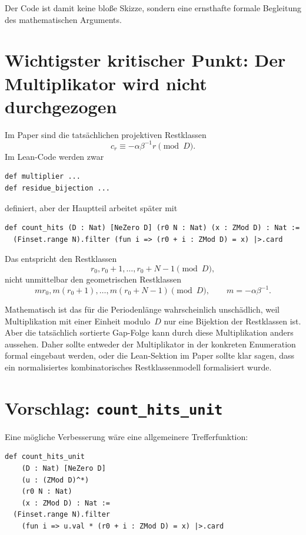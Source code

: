 \documentclass[11pt]{article}
\begin{document}
Der Code ist damit keine bloße Skizze, sondern eine ernsthafte formale Begleitung des mathematischen Arguments.

\section{Wichtigster kritischer Punkt: Der Multiplikator wird nicht durchgezogen}

Im Paper sind die tatsächlichen projektiven Restklassen
\[
    c_r \equiv -\alpha\beta^{-1}r \pmod D.
\]
Im Lean-Code werden zwar

\begin{lstlisting}
def multiplier ...
def residue_bijection ...
\end{lstlisting}

definiert, aber der Hauptteil arbeitet später mit

\begin{lstlisting}
def count_hits (D : Nat) [NeZero D] (r0 N : Nat) (x : ZMod D) : Nat :=
  (Finset.range N).filter (fun i => (r0 + i : ZMod D) = x) |>.card
\end{lstlisting}

Das entspricht den Restklassen
\[
    r_0, r_0+1, \ldots, r_0+N-1 \pmod D,
\]
nicht unmittelbar den geometrischen Restklassen
\[
    m r_0, m(r_0+1), \ldots, m(r_0+N-1) \pmod D,
    \qquad m=-\alpha\beta^{-1}.
\]

Mathematisch ist das für die Periodenlänge wahrscheinlich unschädlich, weil Multiplikation mit einer Einheit modulo~\(D\) nur eine Bijektion der Restklassen ist. Aber die tatsächlich sortierte Gap-Folge kann durch diese Multiplikation anders aussehen. Daher sollte entweder der Multiplikator in der konkreten Enumeration formal eingebaut werden, oder die Lean-Sektion im Paper sollte klar sagen, dass ein normalisiertes kombinatorisches Restklassenmodell formalisiert wurde.

\section{Vorschlag: \texttt{count\_hits\_unit}}

Eine mögliche Verbesserung wäre eine allgemeinere Trefferfunktion:

\begin{lstlisting}
def count_hits_unit
    (D : Nat) [NeZero D]
    (u : (ZMod D)^*)
    (r0 N : Nat)
    (x : ZMod D) : Nat :=
  (Finset.range N).filter
    (fun i => u.val * (r0 + i : ZMod D) = x) |>.card
\end{lstlisting}
\end{document}
